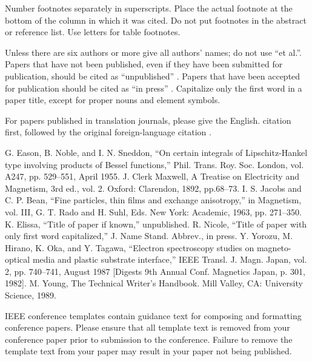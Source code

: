 \documentclass[conference]{IEEEtran}
\begin{document}
Number footnotes separately in superscripts. Place the actual footnote at 
the bottom of the column in which it was cited. Do not put footnotes in the 
abstract or reference list. Use letters for table footnotes.

Unless there are six authors or more give all authors' names; do not use 
``et al.''. Papers that have not been published, even if they have been 
submitted for publication, should be cited as ``unpublished'' \cite{b4}. Papers 
that have been accepted for publication should be cited as ``in press'' \cite{b5}. 
Capitalize only the first word in a paper title, except for proper nouns and 
element symbols.

For papers published in translation journals, please give the English.
citation first, followed by the original foreign-language citation \cite{b6}.

\begin{thebibliography}{99}
 G. Eason, B. Noble, and I. N. Sneddon, ``On certain integrals of Lipschitz-Hankel type involving products of Bessel functions,'' Phil. Trans. Roy. Soc. London, vol. A247, pp. 529--551, April 1955.
 J. Clerk Maxwell, A Treatise on Electricity and Magnetism, 3rd ed., vol. 2. Oxford: Clarendon, 1892, pp.68--73.
 I. S. Jacobs and C. P. Bean, ``Fine particles, thin films and exchange anisotropy,'' in Magnetism, vol. III, G. T. Rado and H. Suhl, Eds. New York: Academic, 1963, pp. 271--350.
 K. Elissa, ``Title of paper if known,'' unpublished.
 R. Nicole, ``Title of paper with only first word capitalized,'' J. Name Stand. Abbrev., in press.
 Y. Yorozu, M. Hirano, K. Oka, and Y. Tagawa, ``Electron spectroscopy studies on magneto-optical media and plastic substrate interface,'' IEEE Transl. J. Magn. Japan, vol. 2, pp. 740--741, August 1987 [Digests 9th Annual Conf. Magnetics Japan, p. 301, 1982].
 M. Young, The Technical Writer's Handbook. Mill Valley, CA: University Science, 1989.
\end{thebibliography}
\vspace{12pt}
\color{red}
IEEE conference templates contain guidance text for composing and formatting conference papers. Please ensure that all template text is removed from your conference paper prior to submission to the conference. Failure to remove the template text from your paper may result in your paper not being published.
\end{document}
